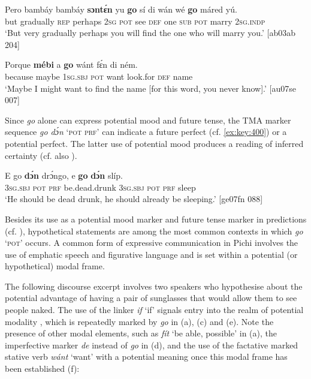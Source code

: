 \ea%
    \label{ex:key:444}
    \gll Pero    bambáy     bambáy  \textbf{sɔntɛ́n}  yu  \textbf{go}  sí  di  wán
wé  \textbf{go}  máred  yú.  \\
but    gradually  \textsc{rep}    perhaps  \textsc{2sg}  \textsc{pot}  see  \textsc{def}  one  
\textsc{sub}  \textsc{pot}  marry  \textsc{2sg.indp}\\

\glt ‘But very gradually perhaps you will find the one who will marry you.’ [ab03ab 204]
\z


\ea%
    \label{ex:key:445}
    \gll Porque  \textbf{mébi}  a    \textbf{go}  wánt  fɛ́n    di  ném.\\
because  maybe  \textsc{1sg.sbj}  \textsc{pot}  want  look.for  \textsc{def}  name\\

\glt ‘Maybe I might want to find the name [for this word, you never know].’ [au07se 007]
\z

Since \textit{go} alone can express potential mood and future tense, the TMA marker sequence \textit{go dɔ́n} ‘\textsc{pot} \textsc{prf}’ can indicate a future perfect (cf. \ref{ex:key:400}) or a potential perfect. The latter use of potential mood produces a reading of inferred certainty (cf. also ).


\ea%
    \label{ex:key:446}
    \gll E    go \textbf{dɔ́n}  drɔ́ngo,      e    \textbf{go} \textbf{dɔ́n} slíp.\\
\textsc{3sg.sbj}  \textsc{pot}  \textsc{prf}  be.dead.drunk  \textsc{3sg.sbj}  \textsc{pot}  \textsc{prf}  sleep\\

\glt ‘He should be dead drunk, he should already be sleeping.’ [ge07fn 088]
\z

Besides its use as a potential mood marker and future tense marker in predictions (cf. ), hypothetical statements are among the most common contexts in which \textit{go} ‘\textsc{pot’} occurs. A common form of expressive communication in Pichi involves the use of emphatic speech and figurative language and is set within a potential (or hypothetical) modal frame.


The following discourse excerpt involves two speakers who hypothesise about the potential advantage of having a pair of sunglasses that would allow them to see people naked. The use of the linker \textit{if} ‘if’ signals entry into the realm of potential modality , which is repeatedly marked by \textit{go} in (a), (c) and (e). Note the presence of other modal elements, such as \textit{fít} ‘be able, possible’ in (a), the imperfective marker \textit{de} instead of \textit{go} in (d), and the use of the factative marked stative verb \textit{wánt} ‘want’ with a potential meaning once this modal frame has been established (f): 




